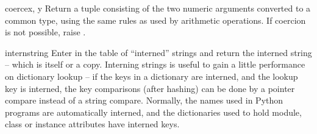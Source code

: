 \begin{funcdesc}{coerce}{x, y}
  Return a tuple consisting of the two numeric arguments converted to
  a common type, using the same rules as used by arithmetic
  operations. If coercion is not possible, raise .
\end{funcdesc}

\begin{funcdesc}{intern}{string}
  Enter  in the table of ``interned'' strings and return
  the interned string -- which is  itself or a copy.
  Interning strings is useful to gain a little performance on
  dictionary lookup -- if the keys in a dictionary are interned, and
  the lookup key is interned, the key comparisons (after hashing) can
  be done by a pointer compare instead of a string compare.  Normally,
  the names used in Python programs are automatically interned, and
  the dictionaries used to hold module, class or instance attributes
  have interned keys.  
\end{funcdesc}
